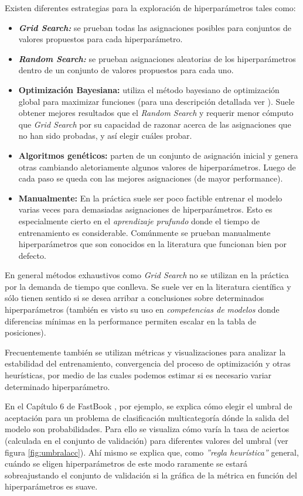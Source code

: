 Existen diferentes estrategias para la exploración de hiperparámetros tales como:
\begin{itemize}
    \item \textit{\textbf{Grid Search:}} se prueban todas las asignaciones posibles para conjuntos de valores propuestos para cada hiperparámetro.
    \item \textit{\textbf{Random Search:}} se prueban asignaciones aleatorias de los hiperparámetros dentro de un conjunto de valores propuestos para cada uno.
    \item \textbf{Optimización Bayesiana:} utiliza el método bayesiano de optimización global para maximizar funciones (para una descripción detallada ver \cite{bayesian}). Suele obtener mejores resultados que el \textit{Random Search} y requerir menor cómputo que \textit{Grid Search} por su capacidad de razonar acerca de las asignaciones que no han sido probadas, y así elegir cuáles probar.
    \item \textbf{Algoritmos genéticos:} parten de un conjunto de asignación inicial y genera otras cambiando aletoriamente algunos valores de hiperparámetros. Luego de cada paso se queda con las mejores asignaciones (de mayor performance).
    \item \textbf{Manualmente:} En la práctica suele ser poco factible entrenar el modelo varias veces para demasiadas asignaciones de hiperparámetros. Esto es especialmente cierto en el \textit{aprendizaje prufundo} donde el tiempo de entrenamiento es considerable.
    Comúnmente se prueban manualmente hiperparámetros que son conocidos en la literatura que funcionan bien por defecto. 
\end{itemize}

En general métodos exhaustivos como \textit{Grid Search} no se utilizan en la práctica por la demanda de tiempo que conlleva. Se suele ver en la literatura científica y sólo tienen sentido si se desea arribar a conclusiones sobre determinados hiperparámetros (también es visto su uso en \textit{competencias de modelos} donde diferencias mínimas en la performance permiten escalar en la tabla de posiciones).

Frecuentemente también se utilizan métricas y visualizaciones para analizar la estabilidad del entrenamiento, convergencia del proceso de optimización y otras heurísticas, por medio de las cuales podemos estimar si es necesario variar determinado hiperparámetro. 

En el Capítulo 6 de FastBook \cite{fastbook}, por ejemplo, se explica cómo elegir el umbral de aceptación para un problema de clasificación multicategoría dónde la salida del modelo son probabilidades. Para ello se visualiza cómo varía la tasa de aciertos (calculada en el conjunto de validación) para diferentes valores del umbral (ver figura \ref{fig:umbralacc}).
Ahí mismo se explica que, como \textit{''regla heurística''} general, cuándo se eligen hiperparámetros de este modo raramente se estará sobreajustando el conjunto de validación si la gráfica de la métrica en función del hiperparámetros es suave.\\

